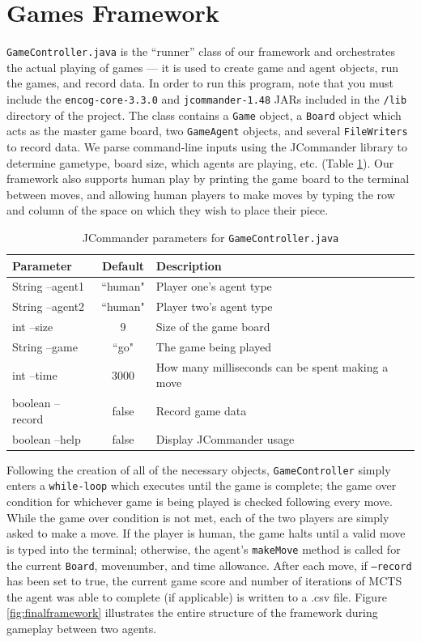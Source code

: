 \section{Games Framework}
\texttt{GameController.java} is the ``runner'' class of our framework and orchestrates the actual playing of games --- it is used to create game and agent objects, run the games, and record data.  In order to run this program, note that you must include the \texttt{encog-core-3.3.0} and \texttt{jcommander-1.48} JARs included in the \texttt{/lib} directory of the project.  The class contains a \texttt{Game} object, a \texttt{Board} object which acts as the master game board, two \texttt{GameAgent} objects, and several \texttt{FileWriters} to record data.  We parse command-line inputs using the JCommander library \cite{jcommander} to determine gametype, board size, which agents are playing, etc. (Table \ref{table:jco}).  Our framework also supports human play by printing the game board to the terminal between moves, and allowing human players to make moves by typing the row and column of the space on which they wish to place their piece.

\begin{table}[h]
\centering
\begin{tabular}{|l|c|l|}
\hline
\textbf{Parameter} & \textbf{Default} & \textbf{Description}\\
\hline
\hline
String --agent1 & ``human" & Player one's agent type \\\hline
String --agent2 & ``human" & Player two's agent type \\\hline
int --size & 9 &  Size of the game board\\\hline
String --game & ``go" & The game being played \\\hline
int --time & 3000 & How many milliseconds can be spent making a move \\\hline
boolean --record & false & Record game data \\\hline
boolean --help & false & Display JCommander usage \\\hline 
\end{tabular}
\caption{JCommander parameters for \texttt{GameController.java}}
\label{table:jco}
\end{table}

Following the creation of all of the necessary objects, \texttt{GameController} simply enters a \texttt{while-loop} which executes until the game is complete; the game over condition for whichever game is being played is checked following every move.  While the game over condition is not met, each of the two players are simply asked to make a move.  If the player is human, the game halts until a valid move is typed into the terminal; otherwise, the agent's \texttt{makeMove} method is called for the current \texttt{Board}, movenumber, and time allowance.  After each move, if \texttt{--record} has been set to true, the current game score and number of iterations of MCTS the agent was able to complete (if applicable) is written to a .csv file.  Figure \ref{fig:finalframework} illustrates the entire structure of the framework during gameplay between two agents.

